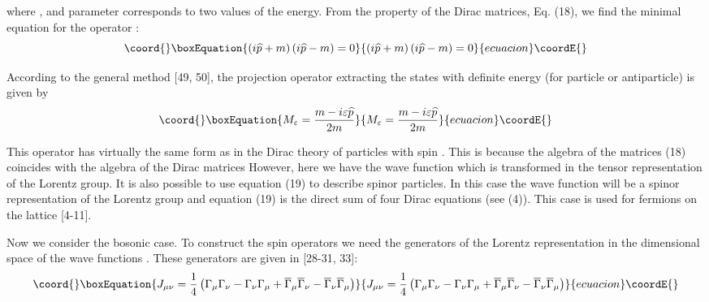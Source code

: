 \documentclass[a4paper,12pt]{article}
\begin{document}
where \coordHE{}, and parameter \coordHE{} corresponds to two values of the energy. From the property
of the Dirac matrices, Eq. (18), we find the minimal equation for
the operator \coordHE{}:
\begin{equation}\coord{}\boxEquation{
\left( i\widehat{p}+m\right) \left( i\widehat{p}-m\right) =0  \label{21}
}{
\left( i\widehat{p}+m\right) \left( i\widehat{p}-m\right) =0  }{ecuacion}\coordE{}\end{equation}

According to the general method [49, 50], the projection operator extracting
the states with definite energy (for particle or antiparticle) is given by
\begin{equation}\coord{}\boxEquation{
M_\varepsilon =\frac{m-i\varepsilon \widehat{p}}{2m}  \label{22}
}{
M_\varepsilon =\frac{m-i\varepsilon \widehat{p}}{2m}  }{ecuacion}\coordE{}\end{equation}

This operator has virtually the same form as in the Dirac theory of
particles with spin \coordHE{}. This is because the algebra of the matrices (18)
coincides with the algebra of the Dirac matrices \coordHE{} However,
here we have the wave function \coordHE{} which is transformed in the tensor
representation of the Lorentz group. It is also possible to use equation
(19) to describe spinor particles. In this case the wave function \coordHE{}
will be a spinor representation of the Lorentz group and equation (19) is
the direct sum of four Dirac equations (see (4)). This case is used for
fermions on the lattice [4-11].

Now we consider the bosonic case. To construct the spin operators we need
the generators of the Lorentz representation in the \coordHE{}dimensional space
of the wave functions \coordHE{}. These generators are given in [28-31, 33]:
\begin{equation}\coord{}\boxEquation{
J_{\mu \nu }=\frac 14\left( \Gamma _\mu \Gamma _\nu -\Gamma _\nu \Gamma _\mu
+\overline{\Gamma }_\mu \overline{\Gamma }_\nu -\overline{\Gamma }_\nu
\overline{\Gamma }_\mu \right)  \label{23}
}{
J_{\mu \nu }=\frac 14\left( \Gamma _\mu \Gamma _\nu -\Gamma _\nu \Gamma _\mu
+\overline{\Gamma }_\mu \overline{\Gamma }_\nu -\overline{\Gamma }_\nu
\overline{\Gamma }_\mu \right)  }{ecuacion}\coordE{}\end{equation}
\end{document}
